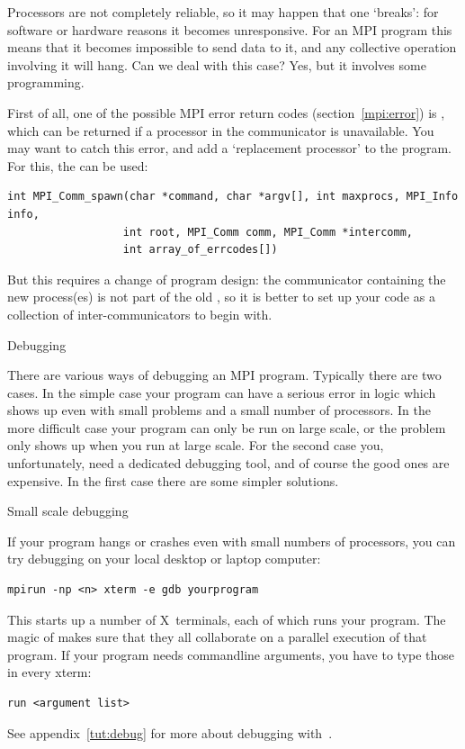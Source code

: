 Processors are not completely reliable, so it may happen that one
`breaks': for software or hardware reasons it becomes
unresponsive. For an MPI program this means that it becomes impossible
to send data to it, and any collective operation involving it will
hang. Can we deal with this case? Yes, but it involves some
programming.

First of all, one of the possible MPI error return codes
(section~\ref{mpi:error}) is , which can be returned
if a processor in the communicator is unavailable. You may want to
catch this error, and add a `replacement processor' to the
program. For this, the  can be used:
\begin{verbatim}
int MPI_Comm_spawn(char *command, char *argv[], int maxprocs, MPI_Info info, 
                  int root, MPI_Comm comm, MPI_Comm *intercomm,
                  int array_of_errcodes[])
\end{verbatim}
But this requires a change of program design: the communicator
containing the new process(es) is not part of the
old , so it is better to set up your code as a
collection of inter-communicators to begin with.

 {Debugging}

There are various ways of debugging an MPI program. Typically there
are two cases. In the simple case your program can have a serious
error in logic which shows up even with small problems and a small
number of processors. In the more difficult case your program can only
be run on large scale, or the problem only shows up when you run at
large scale. For the second case you, unfortunately, need a dedicated
debugging tool, and of course the good ones are expensive. In the
first case there are some simpler solutions.

 {Small scale debugging}

If your program hangs or crashes even with small numbers of
processors, you can try debugging on your local desktop or laptop
computer:
\begin{verbatim}
mpirun -np <n> xterm -e gdb yourprogram
\end{verbatim}
This starts up a number of X~terminals, each of which runs your
program. The magic of  makes sure that they all collaborate
on a parallel execution of that program. If your program needs
commandline arguments, you have to type those in every xterm:
\begin{verbatim}
run <argument list>
\end{verbatim}
See appendix~\ref{tut:debug} for more about debugging with~.

